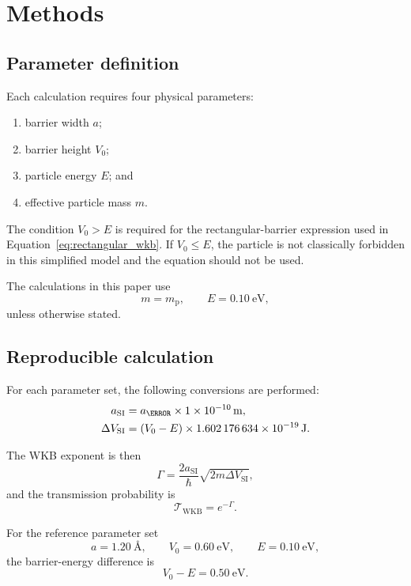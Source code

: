 \documentclass[11pt,a4paper]{article}
\newcommand{\WKB}{\mathrm{WKB}}
\newcommand{\trans}{\mathcal{T}}
\begin{document}
\section{Methods}

\subsection{Parameter definition}

Each calculation requires four physical parameters:
\begin{enumerate}[label=\arabic*.]
    \item barrier width $a$;
    \item barrier height $V_0$;
    \item particle energy $E$; and
    \item effective particle mass $m$.
\end{enumerate}

The condition $V_0>E$ is required for the rectangular-barrier expression used
in Equation~\eqref{eq:rectangular_wkb}. If $V_0\leq E$, the particle is not
classically forbidden in this simplified model and the equation should not be
used.

The calculations in this paper use
\[
m=m_{\mathrm{p}},
\qquad
E=\SI{0.10}{\electronvolt},
\]
unless otherwise stated.

\subsection{Reproducible calculation}

For each parameter set, the following conversions are performed:
\begin{align}
a_{\mathrm{SI}}
&=
a_{\angstrom}\times\SI{1e-10}{\metre},\\
\Delta V_{\mathrm{SI}}
&=
(V_0-E)\times\SI{1.602176634e-19}{\joule}.
\end{align}

The WKB exponent is then
\begin{equation}
\Gamma
=
\frac{2a_{\mathrm{SI}}}{\hbar}
\sqrt{2m\Delta V_{\mathrm{SI}}},
\label{eq:gamma}
\end{equation}
and the transmission probability is
\begin{equation}
\trans_{\WKB}=e^{-\Gamma}.
\label{eq:trans_gamma}
\end{equation}

For the reference parameter set
\[
a=\SI{1.20}{\angstrom},
\qquad
V_0=\SI{0.60}{\electronvolt},
\qquad
E=\SI{0.10}{\electronvolt},
\]
the barrier-energy difference is
\[
V_0-E=\SI{0.50}{\electronvolt}.
\]
\end{document}
